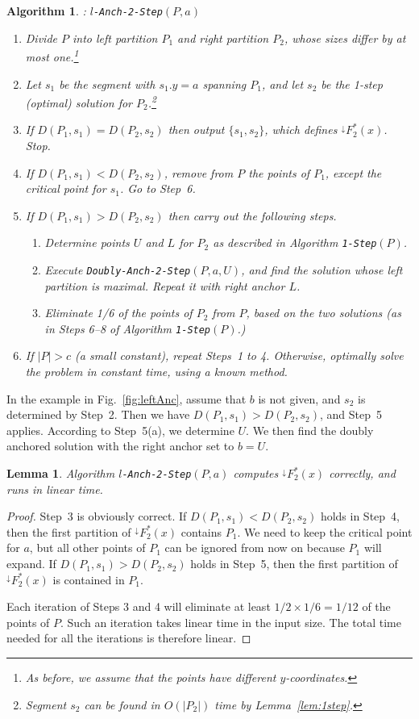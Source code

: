\documentclass[preprint,10pt]{elsarticle}
\newtheorem{lemma}{Lemma}
\newtheorem{algorithm}{Algorithm}
\begin{document}
\begin{algorithm}{\rm :} {\tt $l$-Anch-2-Step}$(P,a)$\label{alg:cond2}
\begin{enumerate}
\item
Divide $P$ into left partition $P_1$ and right partition $P_2$,
whose sizes differ by at most one.\footnote{As before,
we assume that the points have different $y$-coordinates.
}
\item
Let $s_1$ be the segment with $s_1.y=a$ spanning $P_1$,
and let $s_2$ be the 1-step (optimal) solution for $P_2$.\footnote{
Segment $s_2$ can be found in $O(|P_2|)$ time by Lemma~\ref{lem:1step}.}
\item
If $D(P_1, s_1) = D(P_2, s_2)$ then
output $\{s_1,s_2\}$, which defines $^{\downarrow}\!F^*_2(x)$.
Stop.
\item
If $D(P_1, s_1) < D(P_2, s_2)$, remove from $P$ the points of $P_1$,
except the critical point for $s_1$.
Go to Step~6.
\item
If $D(P_1, s_1) > D(P_2, s_2)$ then carry out the following steps.
\begin{enumerate}
\item
Determine points $U$ and $L$ for $P_2$ as described in Algorithm {\tt 1-Step}$(P)$.
\item
Execute {\tt Doubly-Anch-2-Step}$(P,a,U)$,
and find the solution whose left partition is maximal.
Repeat it with right anchor $L$.
\item
Eliminate 1/6 of the points of $P_2$ from $P$, based on the two solutions
(as in Steps 6--8 of Algorithm {\tt 1-Step}$(P)$.)
\end{enumerate}
\item
If $|P| > c$ (a small constant),
repeat Steps~1 to 4.
Otherwise, optimally solve the problem in constant time, using a known method.
\end{enumerate}
\end{algorithm}
In the example in Fig.~\ref{fig:leftAnc}, 
assume that $b$ is not given,
and $s_2$ is determined by Step~2.
Then we have $D(P_1, s_1) > D(P_2, s_2)$,
and Step~5 applies.
According to Step~5(a), we determine $U$.
We then find the doubly anchored solution with the right anchor set to $b=U$.


\begin{lemma}
Algorithm {\tt $l$-Anch-2-Step}$(P,a)$ computes $^{\downarrow}\!F^*_2(x)$ correctly,
and runs in linear time.
\end{lemma}
\begin{proof}
Step~3 is obviously correct.
If $D(P_1, s_1) < D(P_2, s_2)$ holds in Step~4,
then the first partition of $^{\downarrow}\!F^*_2(x)$ contains $P_1$.
We need to keep the critical point for $a$,
but all other points of $P_1$ can be ignored from now on
because $P_1$ will expand.
If $D(P_1, s_1) > D(P_2, s_2)$ holds in Step~5,
then the first partition of $^{\downarrow}\!F^*_2(x)$ is contained in $P_1$.

Each iteration of Steps 3 and 4 will eliminate at least $1/2\times1/6=1/12$ of the points of $P$.
Such an iteration takes linear time in the input size. 
The total time needed for all the iterations is therefore linear.
\end{proof}
\end{document}
